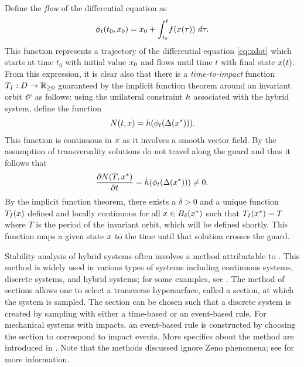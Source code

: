 Define the {\em flow} of the differential equation as
\begin{align*}
  \flowt(t_{0}, \x_{0}) = \x_{0} + \int_{t_{0}}^{t} \! \xf(\x\argtau) \ d\tau.
\end{align*}
%
This function represents a trajectory of the differential equation
\eqref{eq:xdot} which starts at time $t_{0}$ with initial value $x_{0}$ and
flows until time $t$ with final state $x(t)$.
%
From this expression, it is clear also that there is a {\em time-to-impact} function
$T_{I} : D \to \mathbb{R}_{\geq 0}$ guaranteed by the implicit function theorem around an
invariant orbit ${\mathscr O}$ as follows:
%
using the unilateral constraint $h$ associated with the hybrid system, define
the function
\begin{align*}
  N(t, x) = h(\phi_{t}(\Delta(x^{*}))).
\end{align*}
%
This function is continuous in $x$ as it involves a smooth vector field.
%
By the assumption of transversality solutions do not travel along the guard and
thus it follows that
\begin{align*}
  \frac{\partial{N(T, x^{*})}}{\partial{t}} = {\dot {h}}(\phi_{t}(\Delta(x^{*}))) \ne 0.
\end{align*}
%
By the implicit function theorem, there exists a $\delta > 0$ and a unique
function $T_{I}(x)$ defined and locally continuous for all $x \in
B_{\delta}(x^{*})$ such that $T_{I}(x^{*}) = T$ where $T$ is the period of the
invariant orbit, which will be defined shortly.
%
This function maps a given state $x$ to the time until that solution crosses
the guard.
%

Stability analysis of hybrid systems often involves a method attributable to
\Poincare{}.
%
This method is widely used in various types of systems including continuous
systems, discrete systems, and hybrid systems; for some examples, see
\cite{Grizzle2014, Guckenheimer1983, Parker1989, Perko2001}.
%
The method of \Poincare{} sections allows one to select a transverse hypersurface,
called a \Poincare{} section, at which the system is sampled.
%
The \Poincare{} section can be chosen such that a discrete system is created by
sampling with either a time-based or an event-based rule.
%
For mechanical systems with impacts, an event-based rule is constructed by
choosing the \Poincare{} section to correspond to impact events.
%
More specifics about the \Poincare{} method are introduced in
.
%
Note that the methods discussed ignore Zeno phenomena; see \cite{Lamperski2013,
  Or2011} for more information.

